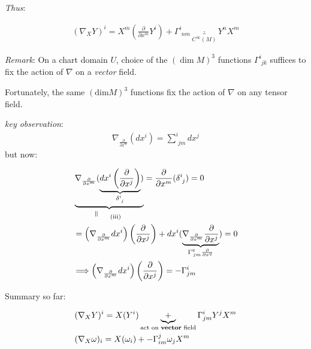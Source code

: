 \emph{Thus}: 
	
	\[
	\begin{gathered}
	(\nabla_X Y)^i = X^m\left( \frac{\partial }{ \partial x^m} Y^i \right) + \Gamma^i_{\, \, nm} \underbrace{\cdot}_{C^{\infty}(M)} Y^n X^m
	\end{gathered}
	\]

\emph{Remark}: On a chart domain $U$, choice of the $(\dim{M})^3$ functions $\Gamma^i_{\,\,jk}$ suffices to fix the action of $\nabla$ on a \emph{vector} field. 

Fortunately, the same $(\text{dim}{M})^3$ functions fix the action of $\nabla$ on any tensor field. 

\emph{key observation}:
\[
\begin{gathered}
	\nabla_{\frac{\partial}{\partial x^m} }(dx^i) = \sum^i_{\, \, jm} dx^j
\end{gathered}
\]
but now: 






	
	
	
	
	
	
	
	
	
	
	
	\[
\begin{aligned}
& \underbrace{ \nabla_{  \frac{ \partial }{ \partial x^m} } ( \underbrace{ dx^i \left( \frac{ \partial }{ \partial x^j } \right) }_{ \delta^i_{ \, \, j} } ) }_{ \rotatebox{90}{$\,=$} \quad \, \text{ (iii) } }  = \frac{ \partial }{ \partial x^m} ( \delta^i_{ \, \, j} ) = 0  \\
& = \left( \nabla_{ \frac{ \partial }{ \partial x^m} } dx^i \right)\left( \frac{ \partial }{ \partial x^j} \right) + dx^i (   \underbrace{ \nabla_{ \frac{ \partial }{ \partial x^m } } \frac{ \partial }{ \partial x^j } }_{ \Gamma^q_{ \, jm }\frac{ \partial }{ \partial x^q} }   ) = 0 \\
& \Longrightarrow \left( \nabla_{ \frac{ \partial }{ \partial x^m } } dx^i \right)\left( \frac{ \partial }{ \partial x^j } \right) = - \Gamma^i_{ jm} 
\end{aligned}
\]

Summary so far:







	
	

\[
\begin{aligned}
& ( \nabla_X Y)^i = X(Y^i) \underbrace{+}_{\text{act on \textbf{vector} field}} \Gamma^i_{jm }  Y^j X^m \\
& (\nabla_X \omega)_i = X(\omega_i) + - \Gamma^j_{im} \omega_j X^m
\end{aligned}
\]

